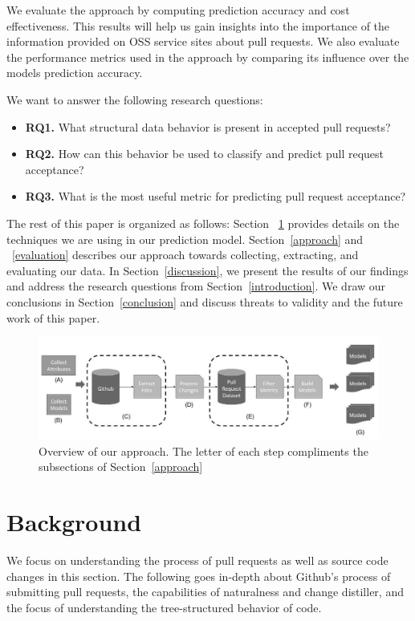 \documentclass[10pt, conference]{IEEEtran}
\begin{document}
We evaluate the approach by computing prediction accuracy and cost effectiveness. This results will help us gain insights into the importance of the information provided on OSS service sites about pull requests. We also evaluate the performance metrics used in the approach by comparing its influence over the model\textquotesingle s prediction accuracy. 

We want to answer the following research questions:
\begin{mdframed} 
\begin{itemize}
\item \textbf{RQ1.} What structural data behavior is present in accepted pull requests?
\item \textbf{RQ2.} How can this behavior be used to classify and predict pull request acceptance?
\item \textbf{RQ3.} What is the most useful metric for predicting pull request acceptance?
\end{itemize}
\end{mdframed}

The rest of this paper is organized as follows: 
Section ~\ref{background} provides details on the techniques we are using in our prediction model. Section~\ref{approach} and ~\ref{evaluation} describes our approach towards collecting, extracting, and evaluating our data. In Section~\ref{discussion}, we present the results of our findings and address the research questions from Section~\ref{introduction}. We draw our conclusions in Section~\ref{conclusion} and discuss threats to validity and the future work of this paper.

\begin{figure}
  \includegraphics[width=\linewidth]{FlowChart.jpg}
  \caption{Overview of our approach. The letter of each step compliments the subsections of Section~\ref{approach}}
  \label{fig:FlowChart}
\end{figure}

\section{Background}
\label{background}
We focus on understanding the process of pull requests as well as source code changes in this section. The following goes in-depth about Github's process of submitting pull requests, the capabilities of naturalness and change distiller, and the focus of understanding the tree-structured behavior of code.
\end{document}
